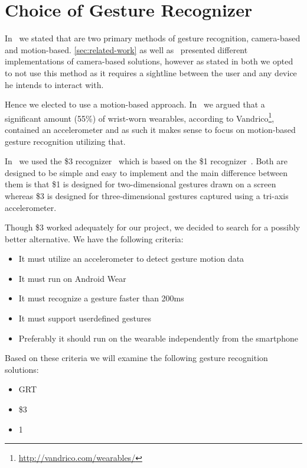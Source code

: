 \section{Choice of Gesture Recognizer}
\label{sec:analysis:choice-of-gesture-recognizer}

In~\cite{prespecialisation} we stated that are two primary methods of gesture recognition, camera-based and motion-based.
\cref{sec:related-work} as well as~\cite{prespecialisation} presented different implementations of camera-based solutions, however as stated in both we opted to not use this method as it requires a sightline between the user and any device he intends to interact with.

Hence we elected to use a motion-based approach.
In~\cite{prespecialisation} we argued that a significant amount (55\%) of wrist-worn wearables, according to Vandrico\footnote{\url{http://vandrico.com/wearables/}}, contained an accelerometer and as such it makes sense to focus on motion-based gesture recognition utilizing that.

In~\cite{prespecialisation} we used the \$3 recognizer~\cite{threedollar} which is based on the \$1 recognizer~\cite{wobbrock2007gestures}.
Both are designed to be simple and easy to implement and the main difference between them is that \$1 is designed for two-dimensional gestures drawn on a screen whereas \$3 is designed for three-dimensional gestures captured using a tri-axis accelerometer.

Though \$3 worked adequately for our project, we decided to search for a possibly better alternative.
We have the following criteria:

\begin{itemize}
    \item It must utilize an accelerometer to detect gesture motion data
    \item It must run on Android Wear
    \item It must recognize a gesture faster than 200ms
    \item It must support userdefined gestures
    \item Preferably it should run on the wearable independently from the smartphone
\end{itemize}
Based on these criteria we will examine the following gesture recognition solutions:

\begin{itemize}
    \item GRT~\cite{gillian2011gesture, gillian2014gesture, gilliangesturegithub}
    \item \$3~\cite{threedollar}
    \item 1\textcent~\cite{herold20121}
\end{itemize}
